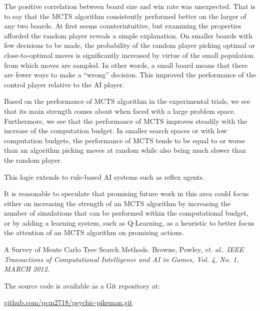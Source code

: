 \documentclass[landscape,final,a0paper,12pt]{baposter}
\begin{document}
\begin{poster}
{The positive correlation between board size and win rate was unexpected.
That is to say that the MCTS algorithm consistently performed better on the larger of any two boards.
At first seems counterintuitive, but examining the properties afforded the random player reveals a simple explanation.
On smaller boards with few decisions to be made, the probability of the random player picking optimal or close-to-optimal moves is significantly increased by virtue of the small population from which moves are sampled.
In other words, a small board means that there are fewer ways to make a ``wrong'' decision.
This improved the performance of the control player relative to the AI player.
}

{
Based on the performance of MCTS algorithm in the experimental trials, we see that its main strength comes about when faced with a large problem space.
Furthermore, we see that the performance of MCTS improves steadily with the increase of the computation budget.
In smaller search spaces or with low computation budgets, the performance of MCTS tends to be equal to or worse than an algorithm picking moves at random while also being much slower than the random player.

This logic extends to rule-based AI systems such as reflex agents.

It is reasonable to speculate that promising future work in this area could focus either on increasing the strength of an MCTS algorithm by increasing the number of simulations that can be performed within the computational budget, or by adding a learning system, such as Q-Learning, as a heuristic to better focus the attention of an MCTS algorithm on promising actions.
}

{
\begin{thebibliography}{9}


  A Survey of Mente Carlo Tree Search Methods. Browne, Powley, {\it et. al.}. {\it IEEE Transactions of Computational Intelligence and AI in Games, Vol. 4, No. 1, MARCH 2012.}

\end{thebibliography}
}

{
The source code is available as a Git repository at:

\indent{    } \url{github.com/pcm2718/psychic-pikeman.git}
}

\end{poster}
\end{document}
